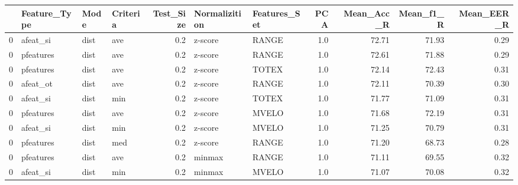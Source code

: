 \begin{tabular}{llllrllrrrr}
\toprule
{} & Feature\_Type &  Mode & Criteria &  Test\_Size & Normalizition & Features\_Set &  PCA &  Mean\_Acc\_R &  Mean\_f1\_R &  Mean\_EER\_R \\
\midrule
0 &     afeat\_si &  dist &      ave &        0.2 &       z-score &        RANGE &  1.0 &       72.71 &      71.93 &        0.29 \\
0 &    pfeatures &  dist &      ave &        0.2 &       z-score &        RANGE &  1.0 &       72.61 &      71.88 &        0.29 \\
0 &    pfeatures &  dist &      ave &        0.2 &       z-score &        TOTEX &  1.0 &       72.14 &      72.43 &        0.31 \\
0 &     afeat\_ot &  dist &      ave &        0.2 &       z-score &        RANGE &  1.0 &       72.11 &      70.39 &        0.30 \\
0 &     afeat\_si &  dist &      min &        0.2 &       z-score &        TOTEX &  1.0 &       71.77 &      71.09 &        0.31 \\
0 &    pfeatures &  dist &      ave &        0.2 &       z-score &        MVELO &  1.0 &       71.68 &      72.19 &        0.31 \\
0 &     afeat\_si &  dist &      min &        0.2 &       z-score &        MVELO &  1.0 &       71.25 &      70.79 &        0.31 \\
0 &    pfeatures &  dist &      med &        0.2 &       z-score &        RANGE &  1.0 &       71.20 &      68.73 &        0.28 \\
0 &    pfeatures &  dist &      ave &        0.2 &        minmax &        RANGE &  1.0 &       71.11 &      69.55 &        0.32 \\
0 &     afeat\_si &  dist &      min &        0.2 &        minmax &        MVELO &  1.0 &       71.07 &      70.08 &        0.32 \\
\bottomrule
\end{tabular}
